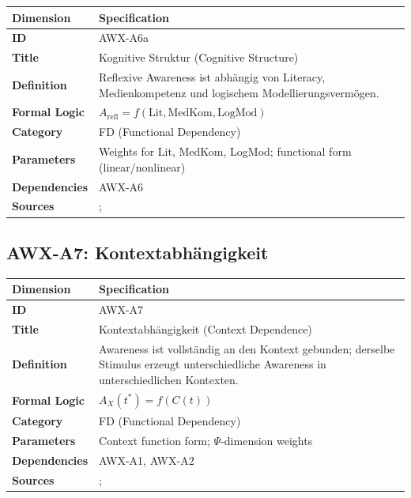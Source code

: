 \begin{table}[htbp]
\small
\begin{tabular}{p{3cm}p{11cm}}
\toprule
\textbf{Dimension} & \textbf{Specification} \\
\midrule
\textbf{ID} & AWX-A6a \\
\textbf{Title} & Kognitive Struktur (Cognitive Structure) \\
\textbf{Definition} & Reflexive Awareness ist abhängig von Literacy, Medienkompetenz und logischem Modellierungsvermögen. \\
\textbf{Formal Logic} & $A_{\text{refl}} = f(\text{Lit}, \text{MedKom}, \text{LogMod})$ \\
\textbf{Category} & FD (Functional Dependency) \\
\textbf{Parameters} & Weights for Lit, MedKom, LogMod; functional form (linear/nonlinear) \\
\textbf{Dependencies} & AWX-A6 \\
\textbf{Sources} & \citet{lusardi2014economic}; \citet{hanushek2012knowledge} \\
\bottomrule
\end{tabular}
\end{table}


\subsection{AWX-A7: Kontextabhängigkeit}

\begin{table}[htbp]
\small
\begin{tabular}{p{3cm}p{11cm}}
\toprule
\textbf{Dimension} & \textbf{Specification} \\
\midrule
\textbf{ID} & AWX-A7 \\
\textbf{Title} & Kontextabhängigkeit (Context Dependence) \\
\textbf{Definition} & Awareness ist vollständig an den Kontext gebunden; derselbe Stimulus erzeugt unterschiedliche Awareness in unterschiedlichen Kontexten. \\
\textbf{Formal Logic} & $A_X(t^*) = f(C(t))$ \\
\textbf{Category} & FD (Functional Dependency) \\
\textbf{Parameters} & Context function form; $\Psi$-dimension weights \\
\textbf{Dependencies} & AWX-A1, AWX-A2 \\
\textbf{Sources} & \citet{tversky1981framing}; \citet{kahneman1990endowment} \\
\bottomrule
\end{tabular}
\end{table}

